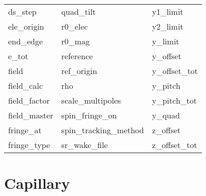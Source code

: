 \begin{tabular}{lll}
ds_step                     & quad_tilt                   & y1_limit                    \\
ele_origin                  & r0_elec                     & y2_limit                    \\
end_edge                    & r0_mag                      & y_limit                     \\
e_tot                       & reference                   & y_offset                    \\
field                       & ref_origin                  & y_offset_tot                \\
field_calc                  & rho                         & y_pitch                     \\
field_factor                & scale_multipoles            & y_pitch_tot                 \\
field_master                & spin_fringe_on              & y_quad                      \\
fringe_at                   & spin_tracking_method        & z_offset                    \\
fringe_type                 & sr_wake_file                & z_offset_tot                \\
 \bottomrule
 \end{tabular}
 \vfill
 
 \section{Capillary}
 \label{s:list.capillary}
 
